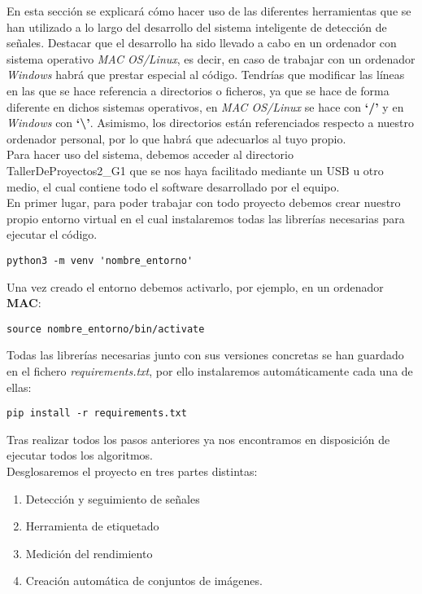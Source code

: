 En esta sección se explicará cómo hacer uso de las diferentes herramientas que se han utilizado a lo largo del desarrollo del sistema inteligente de detección de señales. Destacar que el desarrollo ha sido llevado a cabo en un ordenador con sistema operativo \textit{MAC OS/Linux}, es decir, en caso de trabajar con un ordenador \textit{Windows} habrá que prestar especial al código. Tendrías que modificar las líneas en las que se hace referencia a directorios o ficheros, ya que se hace de forma diferente en dichos sistemas operativos, en \textit{MAC OS/Linux} se hace con \textbf{‘/’} y en \textit{Windows} con \textbf{‘\textbackslash ’}. Asimismo, los directorios están referenciados respecto a nuestro ordenador personal, por lo que habrá que adecuarlos al tuyo propio.\\

Para hacer uso del sistema, debemos acceder al directorio TallerDeProyectos2_G1 que se nos haya facilitado mediante un USB u otro medio, el cual contiene todo el software desarrollado por el equipo.\\

En primer lugar, para poder trabajar con todo proyecto debemos crear nuestro propio entorno virtual en el cual instalaremos todas las librerías necesarias para ejecutar el código. 

\begin{lstlisting}
python3 -m venv 'nombre_entorno'
\end{lstlisting}

Una vez creado el entorno debemos activarlo, por ejemplo, en un ordenador \textbf{MAC}:

\begin{lstlisting}
source nombre_entorno/bin/activate
\end{lstlisting}

Todas las librerías necesarias junto con sus versiones concretas se han guardado en el fichero \textit{requirements.txt}, por ello instalaremos automáticamente cada una de ellas:

\begin{lstlisting}
pip install -r requirements.txt
\end{lstlisting}

Tras realizar todos los pasos anteriores ya nos encontramos en disposición de ejecutar todos los algoritmos.\\
Desglosaremos el proyecto en tres partes distintas:
\begin{enumerate}
\item Detección y seguimiento de señales
\item Herramienta de etiquetado
\item Medición del rendimiento
\item Creación automática de conjuntos de imágenes.
\end{enumerate}

